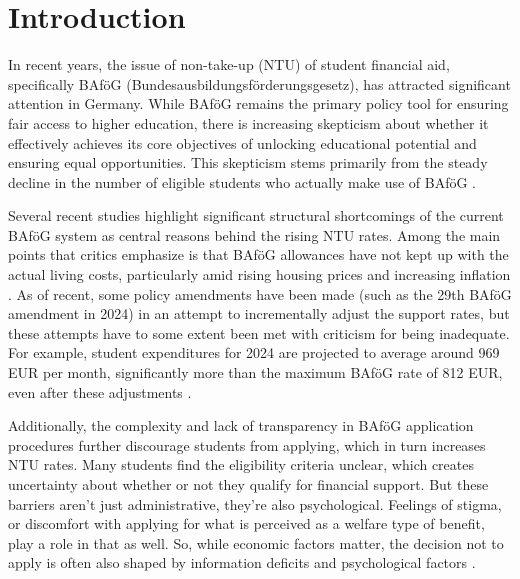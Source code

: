 %
%




\section{Introduction} \label{sec:intro}

In recent years, the issue of non-take-up (NTU) of student financial aid, specifically BAföG (Bundesausbildungsförderungsgesetz), has attracted significant attention in Germany. While BAföG remains the primary policy tool for ensuring fair access to higher education, there is increasing skepticism about whether it effectively achieves its core objectives of unlocking educational potential and ensuring equal opportunities. This skepticism stems primarily from the steady decline in the number of eligible students who actually make use of BAföG \citep{gwosc_krisenbewaltigung_2022, meier_bafog_2024}.

Several recent studies highlight significant structural shortcomings of the current BAföG system as central reasons behind the rising NTU rates. Among the main points that critics emphasize is that BAföG allowances have not kept up with the actual living costs, particularly amid rising housing prices and increasing inflation \citep{meier_bafog_2024, meier_zur_2024, staack_von_2017, gwosc_krisenbewaltigung_2022}. As of recent, some policy amendments have been made (such as the 29th BAföG amendment in 2024) in an attempt to incrementally adjust the support rates, but these attempts have to some extent been met with criticism for being inadequate. For example, student expenditures for 2024 are projected to average around 969 EUR per month, significantly more than the maximum BAföG rate of 812 EUR, even after these adjustments \citep{meier_bafog_2024}.

Additionally, the complexity and lack of transparency in BAföG application procedures further discourage students from applying, which in turn increases NTU rates. Many students find the eligibility criteria unclear, which creates uncertainty about whether or not they qualify for financial support. But these barriers aren’t just administrative, they’re also psychological. Feelings of stigma, or discomfort with applying for what is perceived as a welfare type of benefit, play a role in that as well. So, while economic factors matter, the decision not to apply is often also shaped by information deficits and psychological factors \citep{gwosc_krisenbewaltigung_2022, staack_von_2017}.


